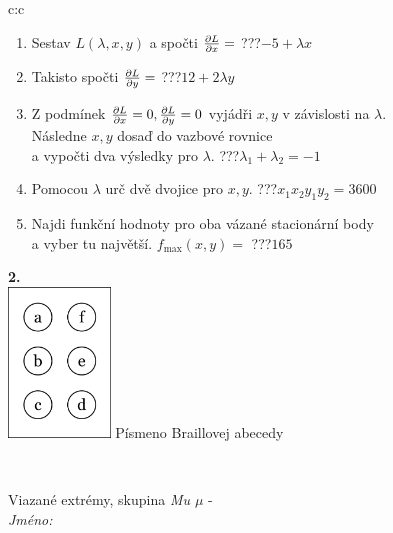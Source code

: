 \documentclass[10pt]{report}
\begin{document}
\begin{tabular}{c:c}
\begin{minipage}[c][104.5mm][t]{0.5\linewidth}
\begin{center}
\begin{minipage}{0.79\linewidth}
\begin{center}
\begin{varwidth}{\linewidth}
\begin{enumerate}
\item Sestav $L(\lambda,x,y)$ a spočti $\pdv{L}{x}=$\quad \dotfill\; ???\;\dotfill \quad $-5+\lambda x$
\item Takisto spočti $\pdv{L}{y}=$\quad \dotfill\; ???\;\dotfill \quad $12+2\lambda y$
\item Z podmínek $\pdv{L}{x}=0 , \pdv{L}{y}=0$ vyjádři $x,y$ v závislosti na $\lambda$.\\ \phantom{xxxxxx}Následne $x,y$ dosaď do vazbové rovnice\\ \phantom{xxxxxx}a vypočti dva výsledky pro $\lambda$.\quad \dotfill\; ???\;\dotfill \quad $\lambda_1+\lambda_2=-1$
\item Pomocou $\lambda$ urč dvě dvojice pro $x,y$.\quad \dotfill\; ???\;\dotfill \quad $x_1 x_2 y_1 y_2=3600$
\item Najdi funkční hodnoty pro oba vázané stacionární body\\ \phantom{xxxxxx}a vyber tu najvětší. $f_{\text{max}}(x,y)=$\quad \dotfill\; ???\;\dotfill \quad $165$
\end{enumerate}
\end{varwidth}
\end{center}
\end{minipage}
\begin{minipage}{0.20\linewidth}
\begin{center}
{\Huge\bfseries 2.} \\[2mm]
\includegraphics[height=40mm]{../images/braille.png}
{\small Písmeno Braillovej abecedy}
\end{center}
\end{minipage}
\end{center}
\end{minipage}
\\ \hdashline
\begin{minipage}[c][104.5mm][t]{0.5\linewidth}
\begin{center}
\vspace{7mm}
{\huge Viazané extrémy, skupina \textit{Mu $\mu$} -}\\[5mm]
\textit{Jméno:}\phantom{xxxxxxxxxxxxxxxxxxxxxxxxxxxxxxxxxxxxxxxxxxxxxxxxxxxxxxxxxxxxxxxxx}\\[5mm]

\end{center}
\end{minipage}
\end{tabular}
\end{document}
